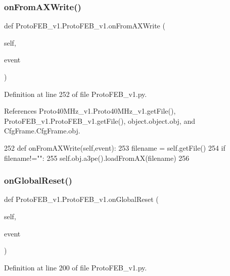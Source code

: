 \subsubsection{\texorpdfstring{on\+From\+A\+X\+Write()}{onFromAXWrite()}}
{\footnotesize\ttfamily def Proto\+F\+E\+B\+\_\+v1.\+Proto\+F\+E\+B\+\_\+v1.\+on\+From\+A\+X\+Write (\begin{DoxyParamCaption}\item[{}]{self,  }\item[{}]{event }\end{DoxyParamCaption})}



Definition at line 252 of file Proto\+F\+E\+B\+\_\+v1.\+py.



References Proto40\+M\+Hz\+\_\+v1.\+Proto40\+M\+Hz\+\_\+v1.\+get\+File(), Proto\+F\+E\+B\+\_\+v1.\+Proto\+F\+E\+B\+\_\+v1.\+get\+File(), object.\+object.\+obj, and Cfg\+Frame.\+Cfg\+Frame.\+obj.


\begin{DoxyCode}
252     \textcolor{keyword}{def }onFromAXWrite(self,event):
253         filename = self.getFile()
254         \textcolor{keywordflow}{if} filename!=\textcolor{stringliteral}{""}:
255             self.obj.a3pe().loadFromAX(filename)
256 
\end{DoxyCode}
\mbox{\label{classProtoFEB__v1_1_1ProtoFEB__v1_a37e3aa3b32821feafcf7f0a3f7edb930}} 
\subsubsection{\texorpdfstring{on\+Global\+Reset()}{onGlobalReset()}}
{\footnotesize\ttfamily def Proto\+F\+E\+B\+\_\+v1.\+Proto\+F\+E\+B\+\_\+v1.\+on\+Global\+Reset (\begin{DoxyParamCaption}\item[{}]{self,  }\item[{}]{event }\end{DoxyParamCaption})}



Definition at line 200 of file Proto\+F\+E\+B\+\_\+v1.\+py.



